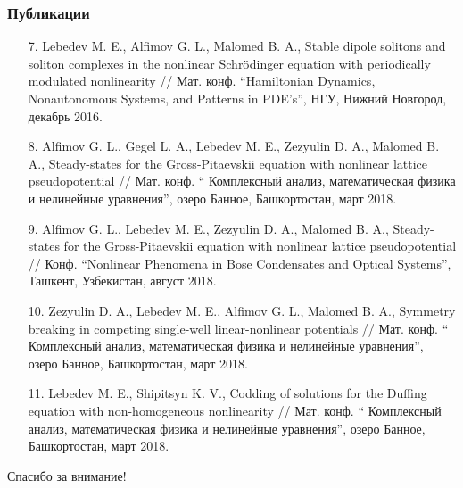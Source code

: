 \documentclass [10pt] {beamer}
\begin{document}
\begin{frame}
	\frametitle{Публикации}
	
	\begin{scriptsize}	
	\begin{enumerate}
	\setlength\itemsep{10pt}
		\item[7.] Lebedev M. E., Alfimov G. L., Malomed B. A., Stable dipole solitons and soliton complexes in the nonlinear Schr\"odinger equation with periodically modulated nonlinearity // Мат. конф. ``Hamiltonian Dynamics, Nonautonomous Systems, and Patterns in PDE’s'', НГУ, Нижний Новгород, декабрь 2016.
		\item[8.] Alfimov G. L., Gegel L. A., Lebedev M. E., Zezyulin D. A., Malomed B. A., Steady-states for the Gross-Pitaevskii equation with nonlinear lattice pseudopotential // Мат. конф. `` Комплексный анализ, математическая физика и нелинейные уравнения'', озеро Банное, Башкортостан, март 2018.
		\item[9.] Alfimov G. L., Lebedev M. E., Zezyulin D. A., Malomed B. A., Steady-states for the Gross-Pitaevskii equation with nonlinear lattice pseudopotential // Конф. ``Nonlinear Phenomena in Bose Condensates and Optical Systems'', Ташкент, Узбекистан, август 2018.
		\item[10.] Zezyulin D. A., Lebedev M. E., Alfimov G. L., Malomed B. A., Symmetry breaking in competing single-well linear-nonlinear potentials // Мат. конф. `` Комплексный анализ, математическая физика и нелинейные уравнения'', озеро Банное, Башкортостан, март 2018.
		\item[11.] Lebedev M. E., Shipitsyn K. V., Codding of solutions for the Duffing equation with non-homogeneous nonlinearity // Мат. конф. `` Комплексный анализ, математическая физика и нелинейные уравнения'', озеро Банное, Башкортостан, март 2018.
	\end{enumerate}
	\end{scriptsize}
\end{frame}

\begin{frame}
	\begin{center}
		{\Huge Спасибо за внимание!}
	\end{center}
\end{frame}
\end{document}
